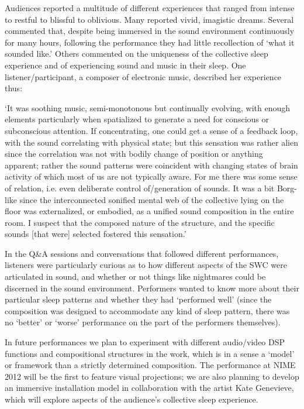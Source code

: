 Audiences reported a multitude of different experiences that ranged from intense
to restful to blissful to oblivious. Many reported vivid, imagistic dreams. 
Several commented that, despite being immersed in the sound environment
continuously for many hours, following the performance they had little
recollection of `what it sounded like.'  Others commented on the uniqueness of
the collective sleep experience and of experiencing sound and music in their
sleep. One listener/participant, a composer of electronic music, described her
experience thus:

`It was soothing music, semi-monotonous but continually evolving, with enough
elements particularly when spatialized to generate a need for conscious or
subconscious attention. If concentrating, one could get a sense of a feedback
loop, with the sound correlating with physical state; but this sensation was
rather alien since the correlation was not with bodily change of position or
anything apparent; rather the sound patterns were coincident with changing states
of brain activity of which most of us are not typically aware. For me there was
some sense of relation, i.e. even deliberate control of/generation of sounds. It
was a bit Borg-like since the interconnected sonified mental web of the
collective lying on the floor was externalized, or embodied, as a unified sound
composition in the entire room. I suspect that the composed nature of the
structure, and the specific sounds [that were] selected fostered this sensation.'

In the Q\&A sessions and conversations that followed different performances,
listeners were particularly curious as to how different aspects of the SWC were
articulated in sound, and whether or not things like nightmares could be
discerned in the sound environment. Performers wanted to know more about their
particular sleep patterns and whether they had `performed well' (since the
composition was designed to accommodate any kind of sleep pattern, there was no
`better' or `worse' performance on the part of the performers themselves).

In future performances we plan to experiment with different audio/video DSP
functions and compositional structures in the work, which is in a sense a `model'
or framework than a strictly determined composition. The performance at NIME 2012
will be the first to feature visual projections; we are also planning to develop
an immersive installation model in collaboration with the artist Kate Genevieve,
which will explore aspects of the audience's collective sleep experience.

